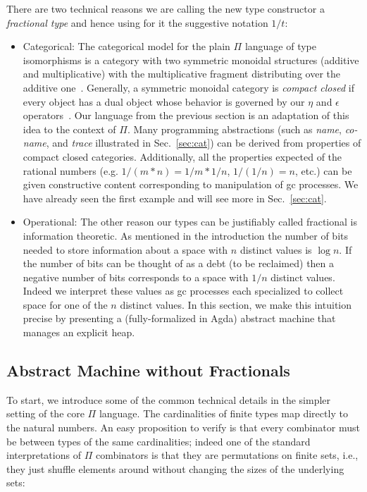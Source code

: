 \documentclass[sigplan,10pt,review,anonymous]{acmart}
\newcommand{\oneover}[1]{1/#1}
\begin{document}
There are two technical reasons we are calling the new type constructor a
\emph{fractional type} and hence using for it the suggestive notation
$\oneover{t}$:
\begin{itemize}
\item Categorical: The categorical model for the plain $\Pi$ language
  of type isomorphisms is a category with two symmetric monoidal
  structures (additive and multiplicative) with the multiplicative fragment
  distributing over the additive one~\cite{DBLP:conf/esop/CaretteS16}. Generally,
  a symmetric monoidal category is \emph{compact closed} if every
  object has a dual object whose behavior is governed by our $\eta$
  and $\epsilon$ operators~\cite{kelly1972many}. Our language from the previous
  section is an adaptation of this idea to the context of $\Pi$. Many
  programming abstractions (such as \emph{name}, \emph{co-name}, and
  \emph{trace} illustrated in Sec.~\ref{sec:cat}) can be
  derived from properties of compact closed categories. Additionally,
  all the properties expected of the rational numbers
  (e.g. $\oneover{(m*n)} = \oneover{m}*\oneover{n}$,
  $\oneover{(\oneover{n})}=n$, etc.) can be given constructive content
  corresponding to manipulation of gc processes. We have already seen
  the first example and will see more in Sec.~\ref{sec:cat}.

\item Operational: The other reason our types can be justifiably
  called fractional is information theoretic. As mentioned in the
  introduction the number of bits needed to store information about a
  space with $n$ distinct values is $\log{n}$. If the number of bits
  can be thought of as a debt (to be reclaimed) then a negative number
  of bits corresponds to a space with $\oneover{n}$ distinct
  values. Indeed we interpret these values as gc processes each
  specialized to collect space for one of the $n$ distinct values. In
  this section, we make this intuition precise by presenting a
  (fully-formalized in Agda) abstract machine that manages an explicit
  heap.
\end{itemize}

\subsection{Abstract Machine without Fractionals}

To start, we introduce some of the common technical details in the
simpler setting of the core $\Pi$ language. The cardinalities of
finite types map directly to the natural numbers. An easy proposition
to verify is that every combinator must be between types of the same
cardinalities; indeed one of the standard interpretations of $\Pi$
combinators is that they are permutations on finite sets, i.e., they
just shuffle elements around without changing the sizes of the
underlying sets:
\end{document}

